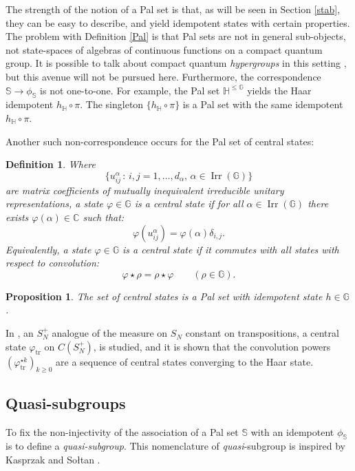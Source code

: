 \documentclass[12pt]{amsart}
\newtheorem{definition}[theorem]{Definition}
\newtheorem{proposition}[theorem]{Proposition}
\theoremstyle{remark}
\theoremstyle{remark}
\begin{document}
The strength of the notion of a Pal set is that, as will be seen in Section \ref{stab}, they can be easy to describe, and yield idempotent states with certain properties. The problem with Definition \ref{Pal}  is that Pal sets are not in general sub-objects, not state-spaces of algebras of continuous functions on a compact quantum group. It is possible to talk about compact quantum \emph{hypergroups} in this setting \cite{frs,fst,lvd}, but this avenue will not be pursued here. Furthermore, the correspondence $\mathbb{S}\to \phi_{\mathbb{S}}$ is not one-to-one. For example,  the Pal set $\mathbb{H}^{\leq \mathbb{G}}$ yields the Haar idempotent $h_{\mathbb{H}}\circ \pi$. The singleton $\{h_{\mathbb{H}}\circ \pi\}$ is  a Pal set with the same idempotent $h_{\mathbb{H}}\circ \pi$.

\bigskip

Another such non-correspondence occurs for the Pal set of central states:
\begin{definition}
Where
$$\{u^{\alpha}_{ij}\,\colon\,i,j=1,\dots, d_\alpha,\,\alpha\in\operatorname{Irr}(\mathbb{G})\}$$
are matrix coefficients of mutually inequivalent irreducible unitary representations, a  state $\varphi\in\mathbb{G}$ is a \emph{central state} if for all $\alpha\in\operatorname{Irr}(\mathbb{G})$ there exists $\varphi(\alpha)\in\mathbb{C}$ such that:
$$\varphi(u^{\alpha}_{ij})=\varphi(\alpha)\delta_{i,j}.$$
Equivalently, a state $\varphi\in\mathbb{G}$ is a central state if it commutes with all states with respect to convolution:
$$\varphi\star\rho=\rho\star \varphi\qquad(\rho\in\mathbb{G}).$$
\end{definition}
\begin{proposition}
The set of central states is a Pal set with idempotent state $h\in \mathbb{G}$.
\end{proposition}


In \cite{fre}, an $S_N^+$ analogue of the measure on $S_N$ constant on transpositions, a central state $\varphi_{\text{tr}}$ on $C(S_N^+)$, is studied, and it is shown that the convolution powers $(\varphi_{\text{tr}}^{\star k})_{k\geq 0}$ are a sequence of central states converging to the Haar state.

\subsection{Quasi-subgroups}

To fix the non-injectivity of the association of a Pal set $\mathbb{S}$ with an idempotent $\phi_{\mathbb{S}}$ is to define a  \emph{quasi-subgroup}. This nomenclature of \emph{quasi}-subgroup is inspired by Kasprzak and So{\l}tan \cite{kap}.
\end{document}
